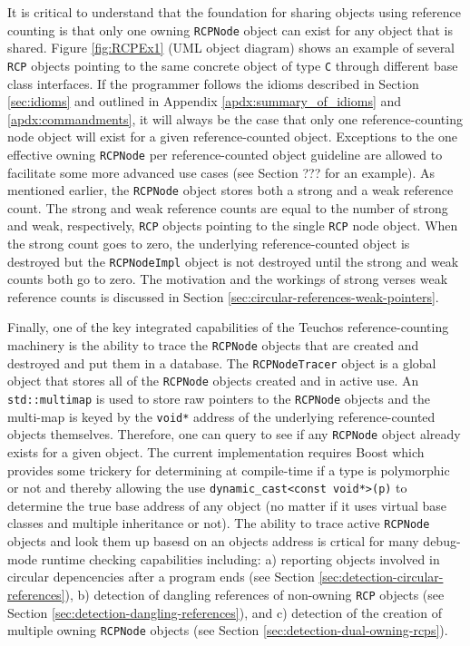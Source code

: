 \documentclass[pdf,ps2pdf,11pt]{SANDreport}
\begin{document}
It is critical to understand that the foundation for sharing objects
using reference counting is that only one owning {}\texttt{RCPNode}
object can exist for any object that is shared.  Figure
{}\ref{fig:RCPEx1} (UML object diagram) shows an example of several
{}\texttt{RCP} objects pointing to the same concrete object of type
{}\texttt{C} through different base class interfaces.  If the
programmer follows the idioms described in Section {}\ref{sec:idioms}
and outlined in Appendix {}\ref{apdx:summary_of_idioms} and
{}\ref{apdx:commandments}, it will always be the case that only one
reference-counting node object will exist for a given
reference-counted object.  Exceptions to the one effective owning
{}\texttt{RCPNode} per reference-counted object guideline are allowed
to facilitate some more advanced use cases (see Section ??? for an
example).  As mentioned earlier, the {}\texttt{RCPNode} object stores
both a strong and a weak reference count.  The strong and weak
reference counts are equal to the number of strong and weak,
respectively, {}\texttt{RCP} objects pointing to the single
{}\texttt{RCP} node object.  When the strong count goes to zero, the
underlying reference-counted object is destroyed but the
{}\texttt{RCPNodeImpl} object is not destroyed until the strong and
weak counts both go to zero.  The motivation and the workings of
strong verses weak reference counts is discussed in Section
{}\ref{sec:circular-references-weak-pointers}.

Finally, one of the key integrated capabilities of the Teuchos
reference-counting machinery is the ability to trace the
{}\texttt{RCPNode} objects that are created and destroyed and put them
in a database.  The {}\texttt{RCPNodeTracer} object is a global object
that stores all of the {}\texttt{RCPNode} objects created and in
active use.  An {}\texttt{std::multimap} is used to store raw pointers
to the {}\texttt{RCPNode} objects and the multi-map is keyed by the
{}\texttt{void*} address of the underlying reference-counted objects
themselves.  Therefore, one can query to see if any {}\texttt{RCPNode}
object already exists for a given object.  The current implementation
requires Boost which provides some trickery for determining at
compile-time if a type is polymorphic or not and thereby allowing the
use {}\texttt{dynamic\_cast<const void*>(p)} to determine the true
base address of any object (no matter if it uses virtual base classes
and multiple inheritance or not).  The ability to trace active
{}\texttt{RCPNode} objects and look them up basesd on an objects
address is crtical for many debug-mode runtime checking capabilities
including: a) reporting objects involved in circular depencencies
after a program ends (see Section
{}\ref{sec:detection-circular-references}), b) detection of dangling
references of non-owning {}\texttt{RCP} objects (see Section
{}\ref{sec:detection-dangling-references}), and c) detection of the
creation of multiple owning {}\texttt{RCPNode} objects (see Section
{}\ref{sec:detection-dual-owning-rcps}).
\end{document}
